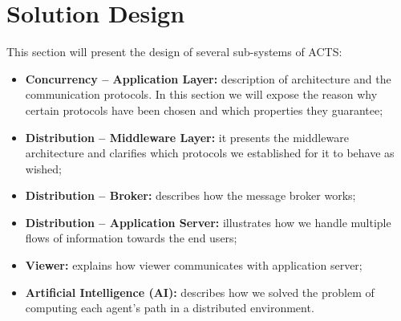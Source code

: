 \section{Solution Design}\label{sec:sol-design}

This section will present the design of several sub-systems of ACTS:

\begin{itemize}
\item \textbf{Concurrency -- Application Layer:}
  description of architecture and the communication protocols.
  In this section we
  will expose the reason why certain protocols have been chosen and which
  properties they guarantee;
\item \textbf{Distribution -- Middleware Layer:}
  it presents the middleware architecture and clarifies which protocols
  we established for it to behave as wished;
\item \textbf{Distribution -- Broker:}
  describes how the message broker works;
\item \textbf{Distribution -- Application Server:}
  illustrates how we handle multiple flows of information towards the end
  users;
\item \textbf{Viewer:}
  explains how viewer communicates with application server;
\item \textbf{Artificial Intelligence (AI):}
  describes how we solved the problem of computing each agent's path
  in a distributed environment.
\end{itemize}







